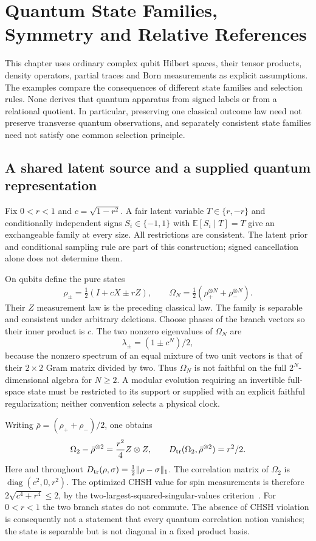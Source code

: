 \section{Quantum State Families, Symmetry and Relative References}
\label{qua:chapter}

This chapter uses ordinary complex qubit Hilbert spaces, their tensor products, density operators, partial traces and Born measurements as explicit assumptions. The examples compare the consequences of different state families and selection rules. None derives that quantum apparatus from signed labels or from a relational quotient. In particular, preserving one classical outcome law need not preserve transverse quantum observations, and separately consistent state families need not satisfy one common selection principle.

\subsection{A shared latent source and a supplied quantum representation}
\label{qua:shared}
Fix $0<r<1$ and $c=\sqrt{1-r^2}$. A fair latent variable $T\in\{r,-r\}$ and conditionally independent signs $S_i\in\{-1,1\}$ with $\mathbb E[S_i\mid T]=T$ give an exchangeable family at every size. All restrictions are consistent. The latent prior and conditional sampling rule are part of this construction; signed cancellation alone does not determine them.

On qubits define the pure states
\[
 \rho_\pm=\tfrac12(I+cX\pm rZ),\qquad
 \Omega_N=\tfrac12(\rho_+^{\otimes N}+\rho_-^{\otimes N}).
\]
Their $Z$ measurement law is the preceding classical law. The family is separable and consistent under arbitrary deletions. Choose phases of the branch vectors so their inner product is $c$. The two nonzero eigenvalues of $\Omega_N$ are
\[
 \lambda_\pm=(1\pm c^N)/2,
\]
because the nonzero spectrum of an equal mixture of two unit vectors is that of their $2\times2$ Gram matrix divided by two. Thus $\Omega_N$ is not faithful on the full $2^N$-dimensional algebra for $N\ge2$. A modular evolution requiring an invertible full-space state must be restricted to its support or supplied with an explicit faithful regularization; neither convention selects a physical clock.

Writing $\bar\rho=(\rho_++\rho_-)/2$, one obtains
\[
 \Omega_2-\bar\rho^{\otimes2}=\frac{r^2}{4}Z\otimes Z,
 \qquad D_{\rm tr}(\Omega_2,\bar\rho^{\otimes2})=r^2/2.
\]
Here and throughout $D_{\rm tr}(\rho,\sigma)=\tfrac12\|\rho-\sigma\|_1$.
The correlation matrix of $\Omega_2$ is $\operatorname{diag}(c^2,0,r^2)$. The optimized CHSH value for spin measurements is therefore
$2\sqrt{c^4+r^4}\le2$, by the two-largest-squared-singular-values criterion~\cite{horodecki}.
For $0<r<1$ the two branch states do not commute. The absence of CHSH violation is consequently not a statement that every quantum correlation notion vanishes; the state is separable but is not diagonal in a fixed product basis.

